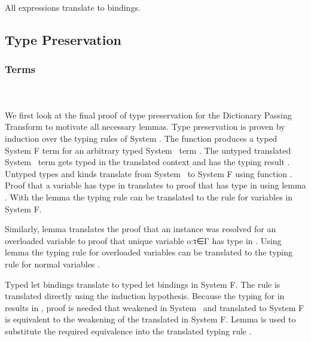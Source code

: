 \noindent All  expressions translate to  bindings.

\subsection{Type Preservation}
\subsubsection{Terms}\hfill\\\\
We first look at the final proof of type preservation for the Dictionary Passing Transform to motivate all necessary lemmas. 
Type preservation is proven by induction over the typing rules of System \Fo. 
The function  produces a typed System F term for an arbitrary typed System \Fo\ term . 
The untyped translated System \Fo\ term   gets typed in the translated context   and has the typing result  . 
Untyped types and kinds translate from System \Fo\ to System F using function .
\DPTTermPres
Proof  that a variable  has type  in  translates to proof that   has type   in   using lemma . 
With the lemma  the typing rule  can be translated to the rule for variables in System F. 

\noindent Similarly, lemma  translates the proof that an instance  \Constr{:}  was resolved for an overloaded variable  to proof that unique variable  {o:τ∈Γ} has type   in  .  
Using lemma  the typing rule for overloaded variables  can be translated to the typing rule for normal variables .

\noindent Typed let bindings    translate to typed let bindings in System F. 
The rule  is translated directly using the induction hypothesis. 
Because the typing for  in  results in  , proof is needed that  weakened in System \Fo\ and translated to System F is equivalent to the weakening of the translated  in System F. 
Lemma  is used to substitute the required equivalence into the translated typing rule  .

